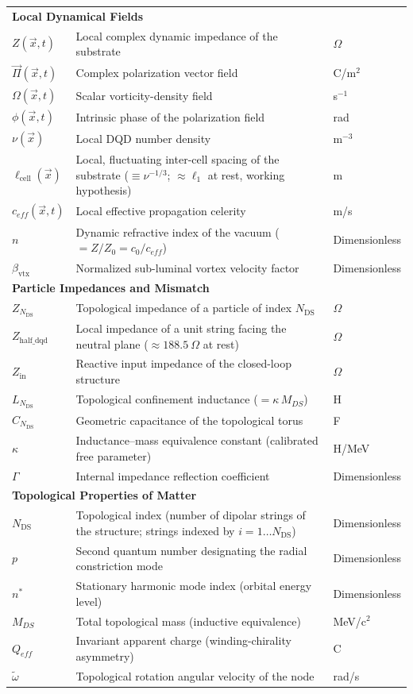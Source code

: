 \documentclass[11pt,a4paper]{article}
\theoremstyle{plain}
\theoremstyle{remark}
\newcommand{\Ncd}{\ensuremath{N_{\mathrm{DS}}}}
\begin{document}
\begin{longtable}{l >{\raggedright\arraybackslash}p{8.8cm} l}
\multicolumn{3}{l}{\textbf{Local Dynamical Fields}} \\
$Z(\vec{x},t)$ & Local complex dynamic impedance of the substrate & $\Omega$ \\
$\vec{\Pi}(\vec{x},t)$ & Complex polarization vector field & C/m$^2$ \\
$\Omega(\vec{x},t)$ & Scalar vorticity-density field & s$^{-1}$ \\
$\phi(\vec{x},t)$ & Intrinsic phase of the polarization field & rad \\
$\nu(\vec{x})$ & Local DQD number density & m$^{-3}$ \\
$\ell_{\text{cell}}(\vec{x})$ & Local, fluctuating inter-cell spacing of the substrate ($\equiv \nu^{-1/3}$; $\approx \ell_1$ at rest, working hypothesis) & m \\
$c_{eff}(\vec{x},t)$ & Local effective propagation celerity & m/s \\
$n$ & Dynamic refractive index of the vacuum ($= Z/Z_0 = c_0/c_{eff}$) & Dimensionless \\
$\beta_{\text{vtx}}$ & Normalized sub-luminal vortex velocity factor & Dimensionless \\
\midrule

\multicolumn{3}{l}{\textbf{Particle Impedances and Mismatch}} \\
$Z_{\Ncd}$ & Topological impedance of a particle of index $\Ncd$ & $\Omega$ \\
$Z_{\text{half\_dqd}}$ & Local impedance of a unit string facing the neutral plane ($\approx 188.5~\Omega$ at rest) & $\Omega$ \\
$Z_{\text{in}}$ & Reactive input impedance of the closed-loop structure & $\Omega$ \\
$L_{\Ncd}$ & Topological confinement inductance ($= \kappa\, M_{DS}$) & H \\
$C_{\Ncd}$ & Geometric capacitance of the topological torus & F \\
$\kappa$ & Inductance--mass equivalence constant (calibrated free parameter) & H/MeV \\
$\Gamma$ & Internal impedance reflection coefficient & Dimensionless \\
\midrule

\multicolumn{3}{l}{\textbf{Topological Properties of Matter}} \\
$\Ncd$ & Topological index (number of dipolar strings of the structure; strings indexed by $i = 1 \ldots \Ncd$) & Dimensionless \\
$p$ & Second quantum number designating the radial constriction mode & Dimensionless \\
$n^*$ & Stationary harmonic mode index (orbital energy level) & Dimensionless \\
$M_{DS}$ & Total topological mass (inductive equivalence) & MeV/c$^2$ \\
$Q_{eff}$ & Invariant apparent charge (winding-chirality asymmetry) & C \\
$\tilde{\omega}$ & Topological rotation angular velocity of the node & rad/s \\
\midrule


\end{longtable}
\end{document}
